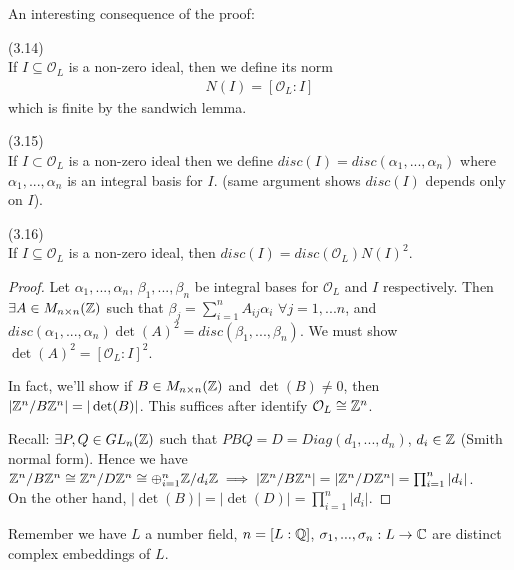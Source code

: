 \documentclass[a4paper]{article}
\begin{document}
An interesting consequence of the proof:
\begin{defi} (3.14)\\
If $I \subseteq \mathcal{O}_L$ is a non-zero ideal, then we define its norm
\begin{equation*}
\begin{aligned}
N(I) = [\mathcal{O}_L:I]
\end{aligned}
\end{equation*}
which is finite by the sandwich lemma.
\end{defi}

\begin{defi} (3.15)\\
If $I \subset \mathcal{O}_L$ is a non-zero ideal then we define $disc(I) = disc(\alpha_1,...,\alpha_n)$ where $\alpha_1,...,\alpha_n$ is an integral basis for $I$. (same argument shows $disc(I)$ depends only on $I$).
\end{defi}

\begin{lemma} (3.16)\\
If $I \subseteq \mathcal{O}_L$ is a non-zero ideal, then $disc(I) = disc(\mathcal{O}_L) N(I)^2$.
\begin{proof}
Let $\alpha_1,...,\alpha_n$, $\beta_1,...,\beta_n$ be integral bases for $\mathcal{O}_L$ and $I$ respectively. Then $\exists A \in M_{n \times n} (\mathbb{Z})$ such that $\beta_j = \sum_{i=1}^n A_{ij} \alpha_i$ $\forall j = 1,...n$, and $disc (\alpha_1,...,\alpha_n) \det(A)^2 = disc(\beta_1,...,\beta_n)$. We must show $\det(A)^2 = [\mathcal{O}_L:I]^2$.

In fact, we'll show if $B \in M_{n \times n} (\mathbb{Z})$ and $\det(B) \neq 0$, then $|\mathbb{Z}^n / B\mathbb{Z}^n| = |\det(B)|$. This suffices after identify $\mathcal{O}_L \cong \mathbb{Z}^n$.

Recall: $\exists P,Q \in GL_n(\mathbb{Z})$ such that $PBQ = D = Diag(d_1,...,d_n)$, $d_i \in \mathbb{Z}$ (Smith normal form). Hence we have $\mathbb{Z}^n/B\mathbb{Z}^n \cong \mathbb{Z}^n/D\mathbb{Z}^n \cong \oplus_{i=1}^n \mathbb{Z}/d_i \mathbb{Z} \implies |\mathbb{Z}^n / B\mathbb{Z}^n| = |\mathbb{Z}^n / D\mathbb{Z}^n| = \prod_{i=1}^n |d_i|$.\\
On the other hand, $|\det(B)| = |\det(D)| = \prod_{i=1}^n |d_i|$.
\end{proof}
\end{lemma}

Remember we have $L$ a number field, $n=[L:\mathbb{Q}]$, $\sigma_1,...,\sigma_n:L \to \mathbb{C}$ are distinct complex embeddings of $L$.
\end{document}
